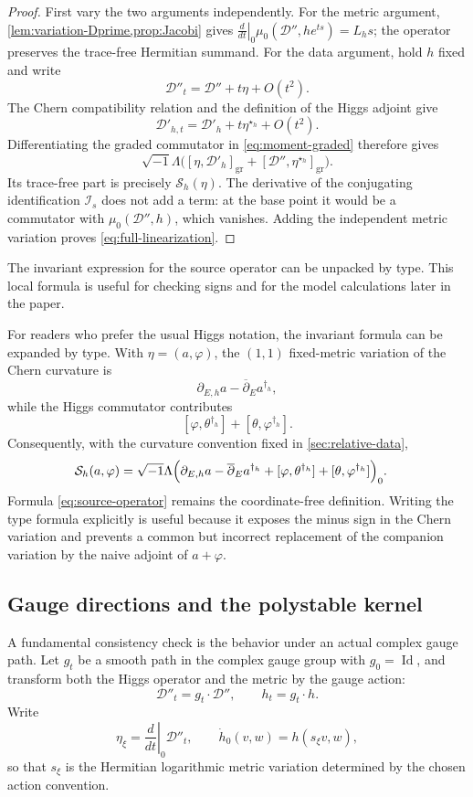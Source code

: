 \documentclass[11pt,reqno]{amsart}
\theoremstyle{definition}
\theoremstyle{remark}
\newcommand{\cD}{\mathcal D}
\newcommand{\cS}{\mathcal S}
\newcommand{\Id}{\operatorname{Id}}
\newcommand{\ddbar}{\overline\partial}
\begin{document}
\begin{proof}
First vary the two arguments independently.  For the metric argument,
\cref{lem:variation-Dprime,prop:Jacobi} gives
$\left.\frac d{dt}\right|_0\mu_0(\cD'',he^{ts})=L_hs$; the operator
preserves the trace-free Hermitian summand.  For the data argument, hold
$h$ fixed and write
\[
  \cD''_t=\cD''+t\eta+O(t^2).
\]
The Chern compatibility relation and the definition of the Higgs adjoint give
\[
  \cD'_{h,t}
  =\cD'_h+t\eta^{\star_h}+O(t^2).
\]
Differentiating the graded commutator in \eqref{eq:moment-graded}
therefore gives
\[
 \sqrt{-1}\Lambda\bigl(
 [\eta,\cD'_h]_{\mathrm{gr}}
 +[\cD'',\eta^{\star_h}]_{\mathrm{gr}}
 \bigr).
\]
Its trace-free part is precisely $\cS_h(\eta)$.  The derivative of the
conjugating identification $\mathcal I_s$ does not add a term: at the
base point it would be a commutator with
$\mu_0(\cD'',h)$, which vanishes.  Adding the independent metric
variation proves \eqref{eq:full-linearization}.
\end{proof}


The invariant expression for the source operator can be unpacked by type.  This local formula is useful for checking signs and for the model calculations later in the paper.


For readers who prefer the usual Higgs notation, the invariant formula can be expanded by type.  With $\eta=(a,\varphi)$, the $(1,1)$ fixed-metric variation of the Chern curvature is
\[
  \partial_{E,h}a-\ddbar_E a^{\dagger_h},
\]
while the Higgs commutator contributes
\[
  [\varphi,\theta^{\dagger_h}]
  +[\theta,\varphi^{\dagger_h}].
\]
Consequently, with the curvature convention fixed in \cref{sec:relative-data},
\begin{align}\label{eq:source-local}
  \cS_h(a,\varphi)
  =\sqrt{-1}\Lambda\Bigl(&
  \partial_{E,h}a-\ddbar_E a^{\dagger_h}
  +[\varphi,\theta^{\dagger_h}]
  +[\theta,\varphi^{\dagger_h}]
  \Bigr)_0.
\end{align}
Formula \eqref{eq:source-operator} remains the coordinate-free definition.  Writing the type formula explicitly is useful because it exposes the minus sign in the Chern variation and prevents a common but incorrect replacement of the companion variation by the naive adjoint of $a+\varphi$.

\subsection{Gauge directions and the polystable kernel}

A fundamental consistency check is the behavior under an actual complex gauge path.  Let $g_t$ be a smooth path in the complex gauge group with $g_0=\Id$, and transform both the Higgs operator and the metric by the gauge action:
\[
  \cD''_t=g_t\cdot\cD'',
  \qquad
  h_t=g_t\cdot h.
\]
Write
\[
  \eta_\xi=\left.\frac d{dt}\right|_0\cD''_t,
  \qquad
  \dot h_0(v,w)=h(s_\xi v,w),
\]
so that $s_\xi$ is the Hermitian logarithmic metric variation determined by the chosen action convention.
\end{document}
